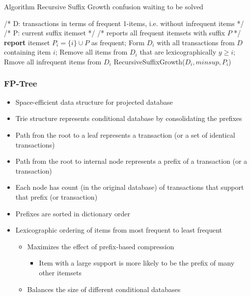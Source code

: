 \documentclass[../notes.tex]{subfiles}
\begin{document}
\newpage

\begin{algorithm}
\caption{Algorithm Recursive Suffix Growth {\color{red} confusion waiting to be solved}}
\begin{algorithmic}[0]
\State /* D: transactions in terms of frequent 1-items, i.e. without infrequent items */
\State /* P: current suffix itemset */
\State /* reports all frequent itemsets with suffix $P$ */ \\

  \State \textbf{report} itemset $P_i = \{i\} \cup P$  as frequent;
  \State Form $D_i$ with all transactions from $D$ containing item $i$;
  \State Remove all items from $D_i$ that are lexicographically $y \ge i$;
  \State Rmove all infrequent items from $D_i$
    RecursiveSuffixGrowth($D_i, minsup, P_i$)
  \EndIf
\EndFor
\EndFunction
\end{algorithmic}
\end{algorithm}

\subsubsection{FP-Tree}
\begin{itemize}
  \item Space-efficient data structure for projected database
  \item Trie structure represents conditional database by consolidating the prefixes
  \item Path fron the root to a leaf represents a transaction (or a set of identical transactions)
  \item Path from the root to internal node represents a prefix of a transaction (or a transaction)
  \item Each node has count (in the original database) of transactions that support that prefix (or transaction)
  \item Prefixes are sorted in dictionary order
  \item Lexicographic ordering of items from most frequent to least frequent
  \begin{itemize}
    \item Maximizes the effect of prefix-based compression
      \begin{itemize}
        \item Item with a large support is more likely to be the prefix of many other itemsets
      \end{itemize}
    \item Balances the size of different conditional databases
  \end{itemize}
\end{itemize}
\end{document}
